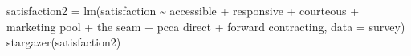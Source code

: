 \documentclass[
]{article}
\newenvironment{Shaded}{\begin{snugshade}}{\end{snugshade}}
\newcommand{\AttributeTok}[1]{\textcolor[rgb]{0.77,0.63,0.00}{#1}}
\newcommand{\FunctionTok}[1]{\textcolor[rgb]{0.00,0.00,0.00}{#1}}
\newcommand{\NormalTok}[1]{#1}
\newcommand{\OtherTok}[1]{\textcolor[rgb]{0.56,0.35,0.01}{#1}}
\newcommand{\SpecialCharTok}[1]{\textcolor[rgb]{0.00,0.00,0.00}{#1}}
\newcommand{\StringTok}[1]{\textcolor[rgb]{0.31,0.60,0.02}{#1}}
\begin{document}
\begin{Shaded}
\begin{Highlighting}[]
\NormalTok{satisfaction2 }\OtherTok{=} \FunctionTok{lm}\NormalTok{(satisfaction }\SpecialCharTok{\textasciitilde{}}\NormalTok{ accessible }\SpecialCharTok{+}\NormalTok{ responsive }\SpecialCharTok{+}\NormalTok{ courteous }\SpecialCharTok{+}
    \StringTok{\textasciigrave{}}\AttributeTok{marketing pool}\StringTok{\textasciigrave{}} \SpecialCharTok{+} \StringTok{\textasciigrave{}}\AttributeTok{the seam}\StringTok{\textasciigrave{}} \SpecialCharTok{+} \StringTok{\textasciigrave{}}\AttributeTok{pcca direct}\StringTok{\textasciigrave{}} \SpecialCharTok{+} \StringTok{\textasciigrave{}}\AttributeTok{forward contracting}\StringTok{\textasciigrave{}}\NormalTok{,}
    \AttributeTok{data =}\NormalTok{ survey)}
\FunctionTok{stargazer}\NormalTok{(satisfaction2)}
\end{Highlighting}
\end{Shaded}
\end{document}
